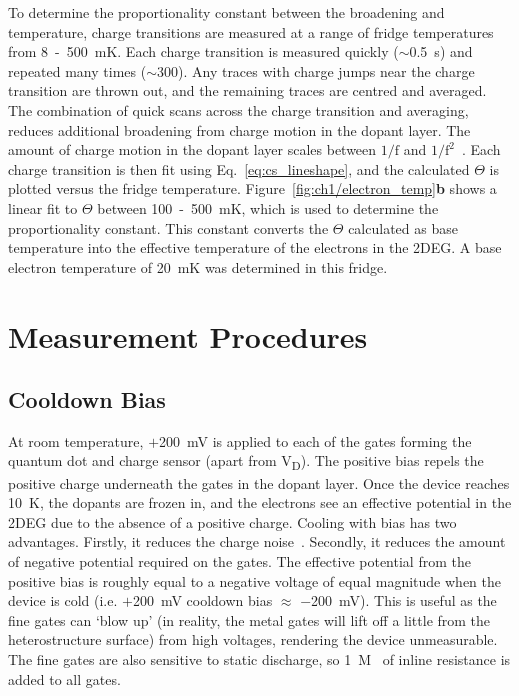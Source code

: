 To determine the proportionality constant between the broadening and temperature, charge transitions are measured at a range of fridge temperatures from \qty{8}{}~-~\qty{500}{mK}. Each charge transition is measured quickly ($\sim$\qty{0.5}{s}) and repeated many times ($\sim$\qty{300}{}). Any traces with charge jumps near the charge transition are thrown out, and the remaining traces are centred and averaged. The combination of quick scans across the charge transition and averaging, reduces additional broadening from charge motion in the dopant layer. The amount of charge motion in the dopant layer scales between $\mathrm{1/f}$ and $\mathrm{1/f^2}$~\cite{charge_noise}. Each charge transition is then fit using Eq.~\ref{eq:cs_lineshape}, and the calculated $\Theta$ is plotted versus the fridge temperature. Figure~\ref{fig:ch1/electron_temp}\textbf{b} shows a linear fit to $\Theta$ between \qty{100}{}~-~\qty{500}{mK}, which is used to determine the proportionality constant. This constant converts the $\Theta$ calculated as base temperature into the effective temperature of the electrons in the 2DEG. A base electron temperature of \qty{20}{mK} was determined in this fridge.



\afterpage{\clearpage}
\section{Measurement Procedures}

\subsection{Cooldown Bias}
At room temperature, $+$\qty{200}{mV} is applied to each of the gates forming the quantum dot and charge sensor (apart from V\textsubscript{D}). The positive bias repels the positive charge underneath the gates in the dopant layer. Once the device reaches \qty{10}{K}, the dopants are frozen in, and the electrons see an effective potential in the 2DEG due to the absence of a positive charge. Cooling with bias has two advantages. Firstly, it reduces the charge noise~\cite{bias_cooling}. Secondly, it reduces the amount of negative potential required on the gates. The effective potential from the positive bias is roughly equal to a negative voltage of equal magnitude when the device is cold (i.e. $+$\qty{200}{mV} cooldown bias $\approx$ $-$\qty{200}{mV}). This is useful as the fine gates can `blow up' (in reality, the metal gates will lift off a little from the heterostructure surface) from high voltages, rendering the device unmeasurable. The fine gates are also sensitive to static discharge, so \qty{1}{M\Omega} of inline resistance is added to all gates. 

